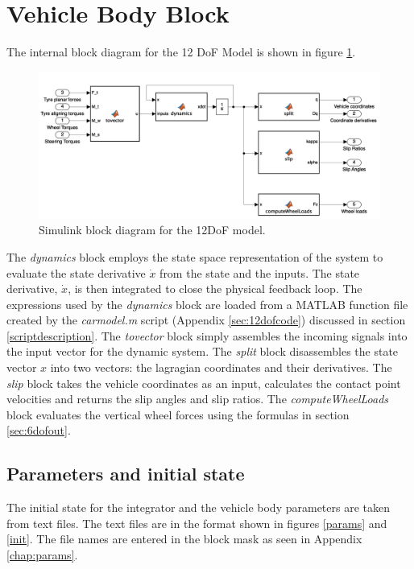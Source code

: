 \section{Vehicle Body Block}
\label{sec:bodyblock}
The internal block diagram for the 12 DoF Model is shown in figure \ref{12diag}.
\begin{figure}[ht]
    \centering
    \includegraphics[width=\textwidth]{images/12dofinside.png}
    \caption{Simulink block diagram for the 12DoF model.}
    \label{12diag}
\end{figure}
The \textit{dynamics} block employs the state space representation of the system to evaluate the state derivative $\dot x$ from the state and the inputs. The state derivative, $\dot x$, is then integrated to close the physical feedback loop. The expressions used by the \textit{dynamics} block are loaded from a MATLAB function file created by the \textit{carmodel.m} script (Appendix \ref{sec:12dofcode}) discussed in section \ref{scriptdescription}.
The \textit{tovector} block simply assembles the incoming signals into the input vector for the dynamic system.
The \textit{split} block disassembles the state vector $x$ into two vectors: the lagragian coordinates and their derivatives.
The \textit{slip} block takes the vehicle coordinates as an input, calculates the contact point velocities and returns the slip angles and slip ratios.
The \textit{computeWheelLoads} block evaluates the vertical wheel forces using the formulas in section \ref{sec:6dofout}.

\subsection{Parameters and initial state}
The initial state for the integrator and the vehicle body parameters are taken from text files. The text files are in the format shown in figures \ref{params} and \ref{init}.
The file names are entered in the block mask as seen in Appendix \ref{chap:params}.

